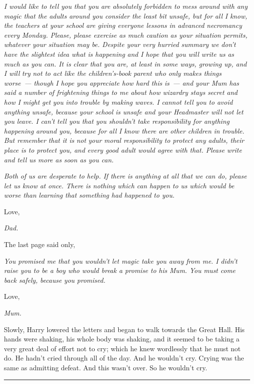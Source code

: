 \emph{I would like to tell you that you are absolutely forbidden to mess around with any magic that the adults around you consider the least bit unsafe, but for all I know, the teachers at your school are giving everyone lessons in advanced necromancy every Monday. Please, please exercise as much caution as your situation permits, whatever your situation may be. Despite your very hurried summary we don't have the slightest idea what is happening and I hope that you will write us as much as you can. It is clear that you are, at least in some ways, growing up, and I will} \emph{try} \emph{not to act like the children's-book parent who only makes things worse~--- though I hope you appreciate how hard this is~--- and your Mum has said a number of frightening things to me about how wizardry stays secret and how I might get} \emph{you} \emph{into trouble by making waves. I cannot tell you to avoid anything unsafe, because your school is unsafe and your Headmaster will not let you leave. I can't tell you that you shouldn't take responsibility for anything happening around you, because for all I know there are other children in trouble. But remember that it is} \emph{not} \emph{your moral responsibility to protect any adults, their place is to protect you, and every good adult would agree with that. Please write and tell us more as soon as you can.}

\emph{Both of us are desperate to help. If there is anything at all that we can do, please let us know at once. There is nothing which can happen to us which would be worse than learning that something had happened to you.}

Love,

\emph{Dad.}

The last page said only,

\emph{You promised me that you wouldn't let magic take you away from me. I didn't raise you to be a boy who would break a promise to his Mum. You must come back safely, because you promised.}

Love,

\emph{Mum.}

Slowly, Harry lowered the letters and began to walk towards the Great Hall. His hands were shaking, his whole body was shaking, and it seemed to be taking a very great deal of effort not to cry; which he knew wordlessly that he must not do. He hadn't cried through all of the day. And he wouldn't cry. Crying was the same as admitting defeat. And this wasn't over. So he wouldn't cry.

\begin{center}\rule{3in}{0.4pt}\end{center}

